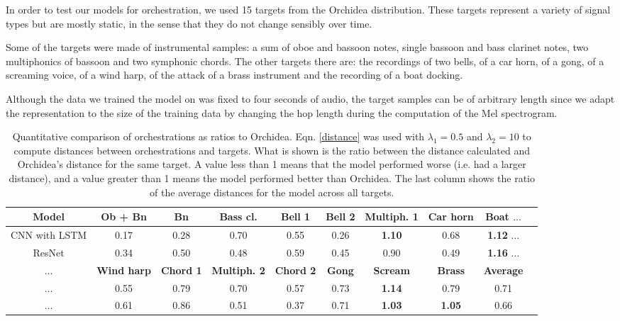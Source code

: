 \documentclass{article}
\begin{document}
In order to test our models for orchestration, we used 15 targets from the Orchidea distribution. These targets represent a variety of signal types but are mostly static, in the sense that they do not change sensibly over time.

Some of the targets were made of instrumental samples: a sum of oboe and bassoon notes, single bassoon and bass clarinet notes, two multiphonics of bassoon and two symphonic chords. The other targets there are: the recordings of two bells, of a car horn, of a gong, of a screaming voice, of a wind harp, of the attack of a brass instrument and the recording of a boat docking. 

Although the data we trained the model on was fixed to four seconds of audio, the target samples can be of arbitrary length since we adapt the representation to the size of the training data by changing the hop length during the computation of the Mel spectrogram.

\begin{table}
  \begin{center}
    \label{orch_eval}
    \begin{tabular}{|c|c|c|c|c|c|c|c|c|c}
     \hline
      \textbf{Model} & \textbf{Ob + Bn} & \textbf{Bn} & \textbf{Bass cl.} & \textbf{Bell 1} & \textbf{Bell 2} & \textbf{Multiph. 1} & \textbf{Car horn} & \textbf{Boat} $\ldots$ \\
      \hline
      CNN with LSTM & 0.17 & 0.28 & 0.70 & 0.55 & 0.26 & \textbf{1.10} & 0.68 & \textbf{1.12} $\ldots$  \\
      \hline
      ResNet & 0.34 & 0.50 & 0.48 & 0.59 & 0.45 & 0.90 & 0.49 & \textbf{1.16} $\ldots$ \\
      \hline
      \hline
      \textbf{$\ldots$} & \textbf{Wind harp} & \textbf{Chord 1} & \textbf{Multiph. 2} & \textbf{Chord 2} & \textbf{Gong} & \textbf{Scream} & \textbf{Brass} & \textbf{Average}  \\
      \hline
      $\ldots$ & 0.55 & 0.79 & 0.70 & 0.57 & 0.73 & \textbf{1.14} & 0.79 & 0.71\\
      \hline
      $\ldots$  & 0.61 & 0.86 & 0.51 & 0.37 & 0.71 & \textbf{1.03} & \textbf{1.05} & 0.66 \\
      \hline
    \end{tabular}
  \end{center}
  \caption{Quantitative comparison of orchestrations as ratios to Orchidea. Eqn. \eqref{distance} was used with $\lambda_1 = 0.5$ and $\lambda_2 = 10$ to compute distances between orchestrations and targets. What is shown is the ratio between the distance calculated and Orchidea's distance for the same target. A value less than 1 means that the model performed worse (i.e. had a larger distance), and a value greater than 1 means the model performed better than Orchidea. The last column shows the ratio of the average distances for the model across all targets.}
\end{table}
\end{document}
